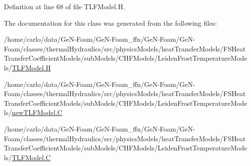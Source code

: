Definition at line 68 of file T\+L\+F\+Model.\+H.



The documentation for this class was generated from the following files\+:\begin{DoxyCompactItemize}
\item 
/home/carlo/data/\+Ge\+N-\/\+Foam/\+Ge\+N-\/\+Foam\+\_\+ffn/\+Ge\+N-\/\+Foam/\+Ge\+N-\/\+Foam/classes/thermal\+Hydraulics/src/physics\+Models/heat\+Transfer\+Models/\+F\+S\+Heat\+Transfer\+Coefficient\+Models/sub\+Models/\+C\+H\+F\+Models/\+Leiden\+Frost\+Temperature\+Models/\hyperlink{TLFModel_8H}{T\+L\+F\+Model.\+H}\item 
/home/carlo/data/\+Ge\+N-\/\+Foam/\+Ge\+N-\/\+Foam\+\_\+ffn/\+Ge\+N-\/\+Foam/\+Ge\+N-\/\+Foam/classes/thermal\+Hydraulics/src/physics\+Models/heat\+Transfer\+Models/\+F\+S\+Heat\+Transfer\+Coefficient\+Models/sub\+Models/\+C\+H\+F\+Models/\+Leiden\+Frost\+Temperature\+Models/\hyperlink{newTLFModel_8C}{new\+T\+L\+F\+Model.\+C}\item 
/home/carlo/data/\+Ge\+N-\/\+Foam/\+Ge\+N-\/\+Foam\+\_\+ffn/\+Ge\+N-\/\+Foam/\+Ge\+N-\/\+Foam/classes/thermal\+Hydraulics/src/physics\+Models/heat\+Transfer\+Models/\+F\+S\+Heat\+Transfer\+Coefficient\+Models/sub\+Models/\+C\+H\+F\+Models/\+Leiden\+Frost\+Temperature\+Models/\hyperlink{TLFModel_8C}{T\+L\+F\+Model.\+C}\end{DoxyCompactItemize}
